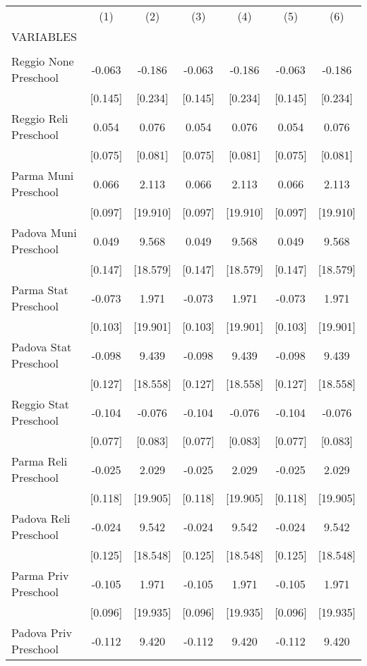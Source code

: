 \begin{tabular}{lcccccc} \hline
 & (1) & (2) & (3) & (4) & (5) & (6) \\
VARIABLES &  &  &  &  &  &  \\ \hline
 &  &  &  &  &  &  \\
Reggio None Preschool & -0.063 & -0.186 & -0.063 & -0.186 & -0.063 & -0.186 \\
 & [0.145] & [0.234] & [0.145] & [0.234] & [0.145] & [0.234] \\
Reggio Reli Preschool & 0.054 & 0.076 & 0.054 & 0.076 & 0.054 & 0.076 \\
 & [0.075] & [0.081] & [0.075] & [0.081] & [0.075] & [0.081] \\
Parma Muni Preschool & 0.066 & 2.113 & 0.066 & 2.113 & 0.066 & 2.113 \\
 & [0.097] & [19.910] & [0.097] & [19.910] & [0.097] & [19.910] \\
Padova Muni Preschool & 0.049 & 9.568 & 0.049 & 9.568 & 0.049 & 9.568 \\
 & [0.147] & [18.579] & [0.147] & [18.579] & [0.147] & [18.579] \\
Parma Stat Preschool & -0.073 & 1.971 & -0.073 & 1.971 & -0.073 & 1.971 \\
 & [0.103] & [19.901] & [0.103] & [19.901] & [0.103] & [19.901] \\
Padova Stat Preschool & -0.098 & 9.439 & -0.098 & 9.439 & -0.098 & 9.439 \\
 & [0.127] & [18.558] & [0.127] & [18.558] & [0.127] & [18.558] \\
Reggio Stat Preschool & -0.104 & -0.076 & -0.104 & -0.076 & -0.104 & -0.076 \\
 & [0.077] & [0.083] & [0.077] & [0.083] & [0.077] & [0.083] \\
Parma Reli Preschool & -0.025 & 2.029 & -0.025 & 2.029 & -0.025 & 2.029 \\
 & [0.118] & [19.905] & [0.118] & [19.905] & [0.118] & [19.905] \\
Padova Reli Preschool & -0.024 & 9.542 & -0.024 & 9.542 & -0.024 & 9.542 \\
 & [0.125] & [18.548] & [0.125] & [18.548] & [0.125] & [18.548] \\
Parma Priv Preschool & -0.105 & 1.971 & -0.105 & 1.971 & -0.105 & 1.971 \\
 & [0.096] & [19.935] & [0.096] & [19.935] & [0.096] & [19.935] \\
Padova Priv Preschool & -0.112 & 9.420 & -0.112 & 9.420 & -0.112 & 9.420 \\

\end{tabular}
